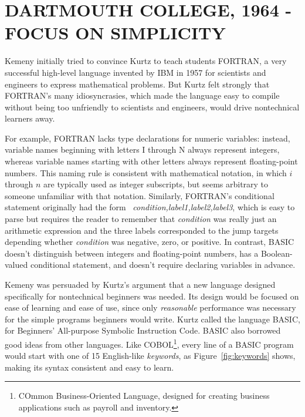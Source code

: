 
\section{DARTMOUTH COLLEGE, 1964 - FOCUS ON SIMPLICITY}


Kemeny initially tried to convince Kurtz to teach students FORTRAN, a
very successful high-level language invented by IBM in 1957 for
scientists and engineers to express mathematical problems.
But Kurtz felt strongly that FORTRAN's many idiosyncrasies, which made
the language easy to compile without being too unfriendly to scientists
and engineers, would drive
nontechnical learners away.

\begin{tangent} For example, FORTRAN lacks type declarations for numeric
  variables: instead,
  variable names beginning with letters I through N always represent
  integers, whereas variable names starting with other letters always
  represent floating-point numbers.
This naming rule is consistent with mathematical notation, in which
$i$ through $n$ are typically used as integer subscripts, but seems
arbitrary to someone unfamiliar with that notation.
Similarly, FORTRAN's conditional statement originally had the form
~\emph{condition,label1,label2,label3}, which is easy 
to parse but requires the reader to remember that \emph{condition} was
really just an arithmetic expression and the three labels 
corresponded to the jump targets depending whether
\emph{condition} was negative, zero, or positive.  
In contrast, BASIC doesn't distinguish between
integers and floating-point numbers, has a Boolean-valued conditional
statement, and doesn't require declaring variables in advance.
\end{tangent}

Kemeny was persuaded by Kurtz's argument that a new language 
designed specifically for nontechnical beginners was needed.
Its design would be focused on ease of learning
and ease of use, since only \emph{reasonable} performance was necessary
for the simple programs beginners would write.
Kurtz called the language BASIC, for Beginners' All-purpose Symbolic
Instruction Code.
BASIC also  borrowed good ideas from other languages.
Like COBOL\footnote{COmmon Business-Oriented Language, designed for creating
business applications such as payroll and inventory.}, every line of a BASIC
program would start with one of 15 English-like \emph{keywords}, as Figure~\ref{fig:keywords} shows,
making its syntax consistent and easy
to learn.

